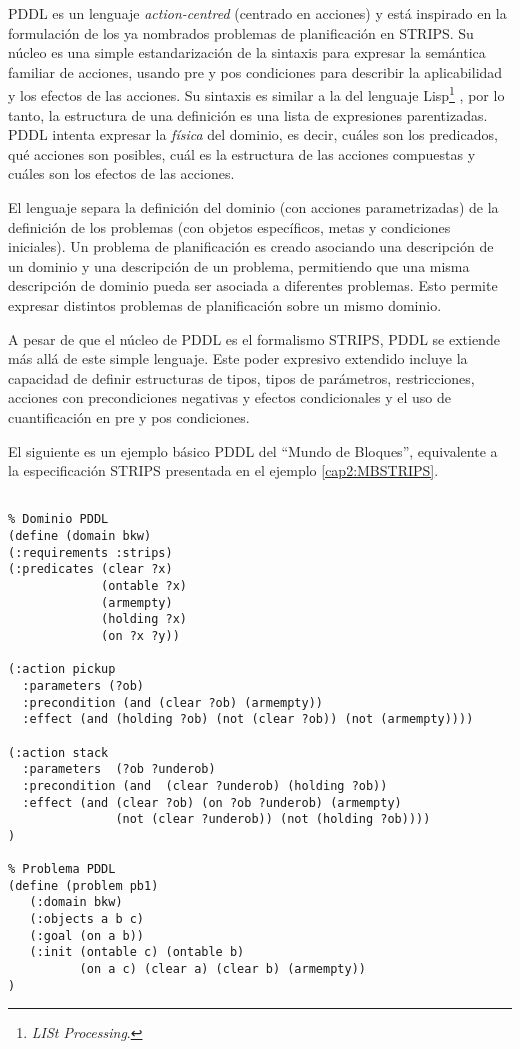 PDDL es un lenguaje \emph{action-centred} (centrado en acciones) y est\'a inspirado 
en la formulaci\'on de los ya nombrados problemas de planificaci\'on en STRIPS. 
Su n\'ucleo es una simple estandarizaci\'on de la sintaxis para expresar la 
sem\'antica familiar de acciones, usando pre y pos condiciones para describir la aplicabilidad y 
los efectos de las acciones. Su sintaxis es similar a la del lenguaje
Lisp\footnote{\emph{LISt Processing}.} \cite{gbraun:lisp}, 
por lo tanto, la estructura de 
una definici\'on es una lista de expresiones parentizadas. PDDL intenta expresar 
la \emph{f\'isica} del dominio, es decir, 
cu\'ales son los predicados, qu\'e acciones son posibles, 
cu\'al es la estructura de las acciones compuestas y cu\'ales son los efectos de las acciones. 

El lenguaje separa la definici\'on del dominio (con acciones parametrizadas)
de la definici\'on de los problemas (con objetos espec\'ificos, metas 
y condiciones iniciales). Un problema de planificaci\'on 
es creado asociando una descripci\'on de un dominio y una descripci\'on de un problema, 
permitiendo que una misma descripci\'on de dominio pueda ser asociada a diferentes problemas. 
Esto permite expresar distintos problemas de planificaci\'on sobre un mismo dominio.

A pesar de que el n\'ucleo de PDDL es el formalismo STRIPS, 
PDDL se extiende m\'as all\'a de este simple lenguaje. 
Este poder expresivo extendido incluye la capacidad de 
definir estructuras de tipos, tipos de par\'ametros, 
restricciones, acciones con precondiciones negativas 
y efectos condicionales y el uso de cuantificaci\'on en pre y pos condiciones.

El siguiente es un ejemplo b\'asico PDDL del ``Mundo de Bloques'', equivalente
a la especificaci\'on STRIPS presentada en el ejemplo \ref{cap2:MBSTRIPS}.  

\begin{ejemplo} \label{pddl:examplebase}
 \begin{verbatim}

% Dominio PDDL
(define (domain bkw)
(:requirements :strips)
(:predicates (clear ?x)
             (ontable ?x)
             (armempty)
             (holding ?x)
             (on ?x ?y))

(:action pickup
  :parameters (?ob)
  :precondition (and (clear ?ob) (armempty))
  :effect (and (holding ?ob) (not (clear ?ob)) (not (armempty))))

(:action stack
  :parameters  (?ob ?underob)
  :precondition (and  (clear ?underob) (holding ?ob))
  :effect (and (clear ?ob) (on ?ob ?underob) (armempty)
               (not (clear ?underob)) (not (holding ?ob))))
)

% Problema PDDL
(define (problem pb1)
   (:domain bkw)
   (:objects a b c)
   (:goal (on a b))
   (:init (ontable c) (ontable b) 
          (on a c) (clear a) (clear b) (armempty))
)
 \end{verbatim}
\end{ejemplo}


